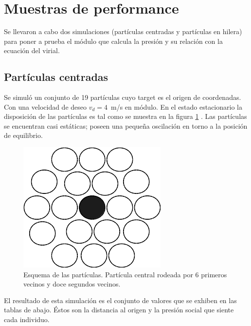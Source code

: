 \section{\label{Muestras de performace} Muestras de performance} 

Se llevaron a cabo dos simulaciones (partículas centradas y partículas en hilera) para poner a prueba el módulo que calcula la presión y su relación con la ecuación del virial. \\ 

\subsection{Partículas centradas}

Se simuló un conjunto de 19 partículas cuyo target es el origen de coordenadas. Con una velocidad de deseo $v_d=4$~m/s en módulo. En el estado estacionario la disposición de las partículas es tal como se muestra en la figura \ref{central} . Las partículas se encuentran casi estáticas; poseen una pequeña oscilación en torno a la posición de equilibrio. 

\begin{figure}[H]
    \centering
        \includegraphics[scale=0.5]{figuras/central.png}
    \caption[width=5cm]{Esquema de las partículas. Partícula central rodeada por 6 primeros vecinos y doce segundos vecinos.}
    \label{central}
\end{figure}


El resultado de esta simulación es el conjunto de valores que se exhiben en las tablas de abajo. Éstos son la distancia al origen y la presión social que siente cada individuo. 

